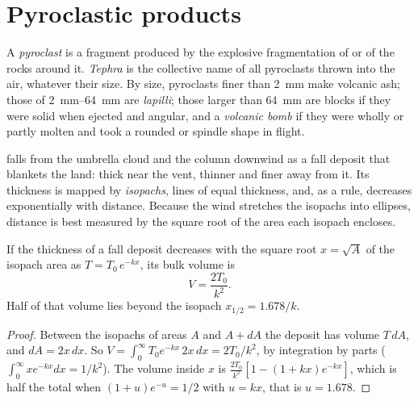 \section{Pyroclastic products}

\begin{definition}\label{def:b2:eruptive-styles:tephra}
A \emph{pyroclast} is a fragment produced by the explosive
fragmentation of  or of the rocks around it. \emph{Tephra} is
the collective name of all pyroclasts thrown into the air, whatever their size.
By size, pyroclasts finer than \qty{2}{mm} make volcanic ash; those of
\qtyrange{2}{64}{mm} are \emph{lapilli}; those larger than
\qty{64}{mm} are blocks if they were solid when ejected and angular, and a
\emph{volcanic bomb} if they were wholly or partly molten
and took a rounded or spindle shape in flight.
\end{definition}

 falls from the umbrella cloud and the column downwind as a fall deposit
that blankets the land: thick near the vent, thinner and finer away from it. Its
thickness is mapped by \emph{isopachs}, lines of equal thickness, and, as a rule,
decreases exponentially with distance. Because the wind stretches the isopachs
into ellipses, distance is best measured by the square root of the area each
isopach encloses.

\begin{proposition}\label{prop:b2:eruptive-styles:thinning}
If the thickness of a fall deposit decreases with the square root $x = \sqrt A$
of the isopach area as $T = T_0\,e^{-kx}$, its bulk volume is
\[
V = \frac{2T_0}{k^2}.
\]
Half of that volume lies beyond the isopach $x_{1/2} = 1.678/k$.
\end{proposition}

\begin{proof}
Between the isopachs of areas $A$ and $A + dA$ the deposit has volume $T\,dA$,
and $dA = 2x\,dx$. So $V = \int_0^\infty T_0e^{-kx}\,2x\,dx = 2T_0/k^2$, by
integration by parts ($\int_0^\infty xe^{-kx}dx = 1/k^2$). The volume inside $x$
is $\frac{2T_0}{k^2}[1 - (1 + kx)e^{-kx}]$, which is half the total when $(1 +
u)e^{-u} = 1/2$ with $u = kx$, that is $u = 1.678$.
\end{proof}


